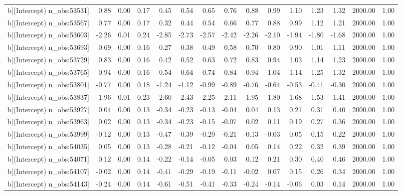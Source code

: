 \begin{table}[ht]
\begin{tabular}{rrrrrrrrrrrrrrr}
  b[(Intercept) n\_obs:53531] & 0.88 & 0.00 & 0.17 & 0.45 & 0.54 & 0.65 & 0.76 & 0.88 & 0.99 & 1.10 & 1.23 & 1.32 & 2000.00 & 1.00 \\ 
  b[(Intercept) n\_obs:53567] & 0.77 & 0.00 & 0.17 & 0.32 & 0.44 & 0.54 & 0.66 & 0.77 & 0.88 & 0.99 & 1.12 & 1.21 & 2000.00 & 1.00 \\ 
  b[(Intercept) n\_obs:53603] & -2.26 & 0.01 & 0.24 & -2.85 & -2.73 & -2.57 & -2.42 & -2.26 & -2.10 & -1.94 & -1.80 & -1.68 & 2000.00 & 1.00 \\ 
  b[(Intercept) n\_obs:53693] & 0.69 & 0.00 & 0.16 & 0.27 & 0.38 & 0.49 & 0.58 & 0.70 & 0.80 & 0.90 & 1.01 & 1.11 & 2000.00 & 1.00 \\ 
  b[(Intercept) n\_obs:53729] & 0.83 & 0.00 & 0.16 & 0.42 & 0.52 & 0.63 & 0.72 & 0.83 & 0.94 & 1.03 & 1.14 & 1.23 & 2000.00 & 1.00 \\ 
  b[(Intercept) n\_obs:53765] & 0.94 & 0.00 & 0.16 & 0.54 & 0.64 & 0.74 & 0.84 & 0.94 & 1.04 & 1.14 & 1.25 & 1.32 & 2000.00 & 1.00 \\ 
  b[(Intercept) n\_obs:53801] & -0.77 & 0.00 & 0.18 & -1.24 & -1.12 & -0.99 & -0.89 & -0.76 & -0.64 & -0.53 & -0.41 & -0.30 & 2000.00 & 1.00 \\ 
  b[(Intercept) n\_obs:53837] & -1.96 & 0.01 & 0.23 & -2.60 & -2.43 & -2.25 & -2.11 & -1.95 & -1.80 & -1.68 & -1.53 & -1.41 & 2000.00 & 1.00 \\ 
  b[(Intercept) n\_obs:53927] & 0.04 & 0.00 & 0.13 & -0.34 & -0.23 & -0.13 & -0.04 & 0.04 & 0.13 & 0.21 & 0.31 & 0.40 & 2000.00 & 1.00 \\ 
  b[(Intercept) n\_obs:53963] & 0.02 & 0.00 & 0.13 & -0.34 & -0.23 & -0.15 & -0.07 & 0.02 & 0.11 & 0.19 & 0.27 & 0.36 & 2000.00 & 1.00 \\ 
  b[(Intercept) n\_obs:53999] & -0.12 & 0.00 & 0.13 & -0.47 & -0.39 & -0.29 & -0.21 & -0.13 & -0.03 & 0.05 & 0.15 & 0.22 & 2000.00 & 1.00 \\ 
  b[(Intercept) n\_obs:54035] & 0.05 & 0.00 & 0.13 & -0.28 & -0.21 & -0.12 & -0.04 & 0.05 & 0.14 & 0.22 & 0.32 & 0.39 & 2000.00 & 1.00 \\ 
  b[(Intercept) n\_obs:54071] & 0.12 & 0.00 & 0.14 & -0.22 & -0.14 & -0.05 & 0.03 & 0.12 & 0.21 & 0.30 & 0.40 & 0.46 & 2000.00 & 1.00 \\ 
  b[(Intercept) n\_obs:54107] & -0.02 & 0.00 & 0.14 & -0.41 & -0.29 & -0.19 & -0.11 & -0.02 & 0.07 & 0.15 & 0.26 & 0.34 & 2000.00 & 1.00 \\ 
  b[(Intercept) n\_obs:54143] & -0.24 & 0.00 & 0.14 & -0.61 & -0.51 & -0.41 & -0.33 & -0.24 & -0.14 & -0.06 & 0.03 & 0.14 & 2000.00 & 1.00 \\ 

\end{tabular}
\end{table}
